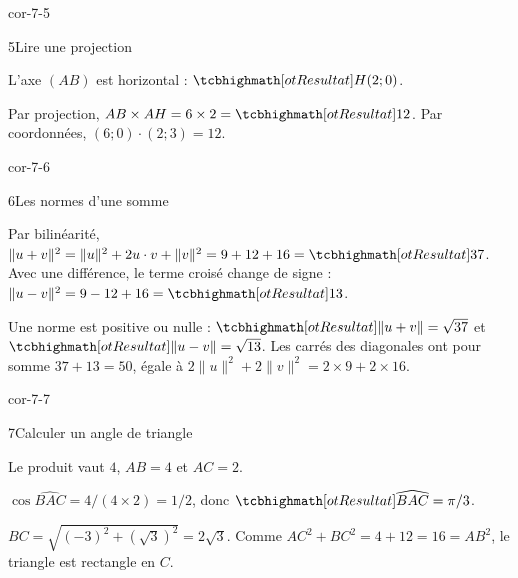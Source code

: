 \begin{blocLivre}{cor-7-5}
\begin{corrige}{5}{Lire une projection}
\begin{questions}
\item L’axe $(AB)$ est horizontal : $\res{H(2;0)}$.
\item Par projection, $AB\times AH=6\times2=\res{12}$. Par coordonnées, $(6;0)\cdot(2;3)=12$.
\end{questions}

\label{figgeo-07-05-cor}
\end{corrige}
\end{blocLivre}
\begin{blocLivre}{cor-7-6}
\begin{corrige}{6}{Les normes d'une somme}
\begin{questions}
\item Par bilinéarité,
$\|u+v\|^2=\|u\|^2+2u\cdot v+\|v\|^2=9+12+16=\res{37}$.
Avec une différence, le terme croisé change de signe :
$\|u-v\|^2=9-12+16=\res{13}$.
\item Une norme est positive ou nulle : $\res{\|u+v\|=\sqrt{37}}$ et $\res{\|u-v\|=\sqrt{13}}$.
Les carrés des diagonales ont pour somme $37+13=50$, égale à $2\|u\|^2+2\|v\|^2=2\times9+2\times16$.
\end{questions}
\label{figgeo-07-06-cor}
\end{corrige}
\end{blocLivre}
\begin{blocLivre}{cor-7-7}
\begin{corrige}{7}{Calculer un angle de triangle}
\begin{questions}
\item Le produit vaut $4$, $AB=4$ et $AC=2$.
\item $\cos\widehat{BAC}=4/(4\times2)=1/2$, donc $\res{\widehat{BAC}=\pi/3}$.
\item $BC=\sqrt{(-3)^2+(\sqrt3)^2}=2\sqrt3$. Comme $AC^2+BC^2=4+12=16=AB^2$, le triangle est rectangle en $C$.
\end{questions}

\label{figgeo-07-07-cor}
\end{corrige}
\end{blocLivre}
